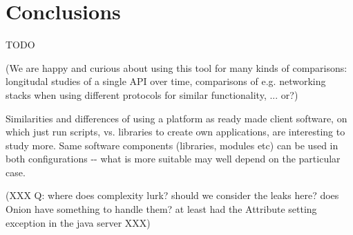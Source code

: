 \documentclass[conference]{IEEEtran}
\begin{document}
\section{Conclusions%
  \label{conclusions}%
}

TODO

(We are happy and curious about using this tool for many kinds of
comparisons: longitudal studies of a single API over time, comparisons
of e.g. networking stacks when using different protocols for similar
functionality, ... or?)

Similarities and differences of using a platform as ready made client
software, on which just run scripts, vs. libraries to create own
applications, are interesting to study more. Same software components
(libraries, modules etc) can be used in both configurations -{}- what is
more suitable may well depend on the particular case.

(XXX Q: where does complexity lurk? should we consider the leaks here?
does Onion have something to handle them? at least had the Attribute
setting exception in the java server XXX)
\end{document}
